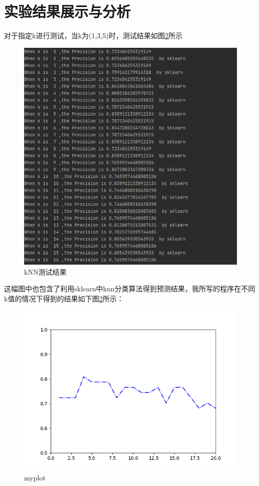 \documentclass[UTF8,a4paper,10pt]{ctexart}
\begin{document}
\section{实验结果展示与分析}
对于指定k进行测试，当k为(1,3,5)时，测试结果如图\ref{fig:1}所示
\begin{figure}[H]
    \centering
    \includegraphics[scale=0.7]{2.png}
    \caption{kNN测试结果}
    \label{fig:1}
\end{figure}
这幅图中也包含了利用sklearn中knn分类算法得到预测结果，我所写的程序在不同k值的情况下得到的结果如下图\ref{fig:1}所示：
\begin{figure}[H]
    \centering
    \includegraphics[scale=0.7]{3.png}
    \caption{myplot}
    \label{fig:1}
\end{figure}




\end{document}
